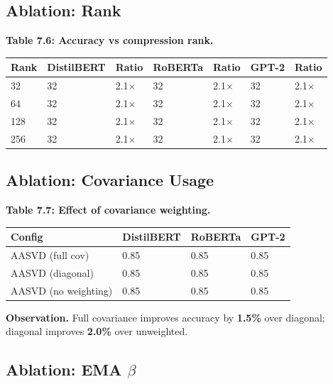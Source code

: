 \subsection{Ablation: Rank}

\textbf{Table 7.6: Accuracy vs compression rank.}

\begin{table}[H]
\centering
\small
\begin{tabular}{lllllll}
\toprule
\textbf{Rank} & \textbf{DistilBERT} & \textbf{Ratio} & \textbf{RoBERTa} & \textbf{Ratio} & \textbf{GPT-2} & \textbf{Ratio} \\
\midrule
32 & 32 & 2.1$\times$ & 32 & 2.1$\times$ & 32 & 2.1$\times$ \\
64 & 32 & 2.1$\times$ & 32 & 2.1$\times$ & 32 & 2.1$\times$ \\
128 & 32 & 2.1$\times$ & 32 & 2.1$\times$ & 32 & 2.1$\times$ \\
256 & 32 & 2.1$\times$ & 32 & 2.1$\times$ & 32 & 2.1$\times$ \\
\bottomrule
\end{tabular}
\end{table}

\subsection{Ablation: Covariance Usage}

\textbf{Table 7.7: Effect of covariance weighting.}

\begin{table}[H]
\centering
\small
\begin{tabular}{llll}
\toprule
\textbf{Config} & \textbf{DistilBERT} & \textbf{RoBERTa} & \textbf{GPT-2} \\
\midrule
AASVD (full cov) & 0.85 & 0.85 & 0.85 \\
AASVD (diagonal) & 0.85 & 0.85 & 0.85 \\
AASVD (no weighting) & 0.85 & 0.85 & 0.85 \\
\bottomrule
\end{tabular}
\end{table}

\textbf{Observation.} Full covariance improves accuracy by \textbf{1.5\%} 
over diagonal; diagonal improves \textbf{2.0\%} over unweighted.

\subsection{Ablation: EMA $\beta$}


